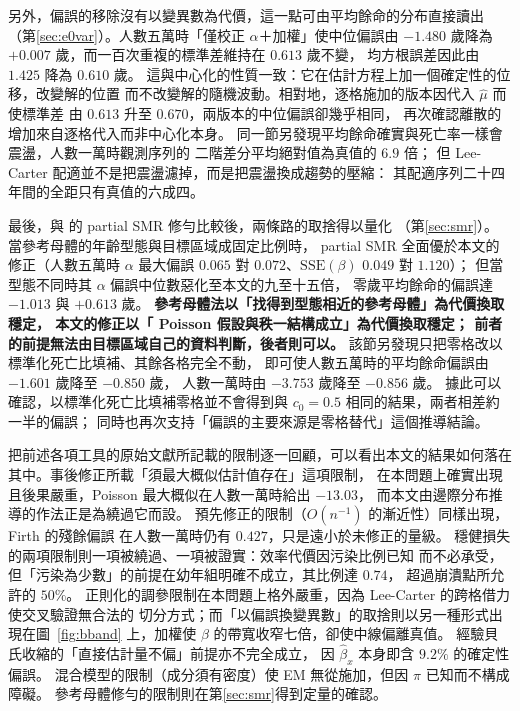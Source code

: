 \documentclass[UTF8, fontset=macnew, a4paper, 12pt]{ctexart}
\begin{document}
另外，偏誤的移除沒有以變異數為代價，這一點可由平均餘命的分布直接讀出
（第\ref{sec:e0var}）。人數五萬時「僅校正 $\alpha$＋加權」使中位偏誤由
$-1.480$ 歲降為 $+0.007$ 歲，而一百次重複的標準差維持在 $0.613$ 歲不變，
均方根誤差因此由 $1.425$ 降為 $0.610$ 歲。
這與中心化的性質一致：它在估計方程上加一個確定性的位移，改變解的位置
而不改變解的隨機波動。相對地，逐格施加的版本因代入 $\hat\mu$ 而使標準差
由 $0.613$ 升至 $0.670$，兩版本的中位偏誤卻幾乎相同，
再次確認離散的增加來自逐格代入而非中心化本身。
同一節另發現平均餘命確實與死亡率一樣會震盪，人數一萬時觀測序列的
二階差分平均絕對值為真值的 $6.9$ 倍；
但 Lee-Carter 配適並不是把震盪濾掉，而是把震盪換成趨勢的壓縮：
其配適序列二十四年間的全距只有真值的六成四。

最後，與 \citet{lee2003}的 partial SMR 修勻比較後，兩條路的取捨得以量化
（第\ref{sec:smr}）。當參考母體的年齡型態與目標區域成固定比例時，
partial SMR 全面優於本文的修正（人數五萬時 $\alpha$ 最大偏誤 $0.065$
對 $0.072$、$\mathrm{SSE}(\beta)$ $0.049$ 對 $1.120$）；
但當型態不同時其 $\alpha$ 偏誤中位數惡化至本文的九至十五倍，
零歲平均餘命的偏誤達 $-1.013$ 與 $+0.613$ 歲。
\textbf{參考母體法以「找得到型態相近的參考母體」為代價換取穩定，
本文的修正以「 Poisson 假設與秩一結構成立」為代價換取穩定；
前者的前提無法由目標區域自己的資料判斷，後者則可以。}
該節另發現只把零格改以標準化死亡比填補、其餘各格完全不動，
即可使人數五萬時的平均餘命偏誤由 $-1.601$ 歲降至 $-0.850$ 歲，
人數一萬時由 $-3.753$ 歲降至 $-0.856$ 歲。
據此可以確認，以標準化死亡比填補零格並不會得到與
$c_0=0.5$ 相同的結果，兩者相差約一半的偏誤；
同時也再次支持「偏誤的主要來源是零格替代」這個推導結論。

把前述各項工具的原始文獻所記載的限制逐一回顧，可以看出本文的結果如何落在
其中。事後修正所載「須最大概似估計值存在」這項限制，
在本問題上確實出現且後果嚴重，Poisson 最大概似在人數一萬時給出 $-13.03$，
而本文由邊際分布推導的作法正是為繞過它而設。
預先修正的限制（$O(n^{-1})$ 的漸近性）同樣出現，Firth 的殘餘偏誤
在人數一萬時仍有 $0.427$，只是遠小於未修正的量級。
穩健損失的兩項限制則一項被繞過、一項被證實：效率代價因污染比例已知
而不必承受，但「污染為少數」的前提在幼年組明確不成立，其比例達 $0.74$，
超過崩潰點所允許的 $50\%$。
正則化的調參限制在本問題上格外嚴重，因為 Lee-Carter 的跨格借力使交叉驗證無合法的
切分方式；而「以偏誤換變異數」的取捨則以另一種形式出現在圖~\ref{fig:bband}
上，加權使 $\beta$ 的帶寬收窄七倍，卻使中線偏離真值。
經驗貝氏收縮的「直接估計量不偏」前提亦不完全成立，
因 $\hat\beta_x$ 本身即含 $9.2\%$ 的確定性偏誤。
混合模型的限制（成分須有密度）使 EM 無從施加，但因 $\pi$ 已知而不構成障礙。
參考母體修勻的限制則在第\ref{sec:smr}得到定量的確認。
\end{document}
